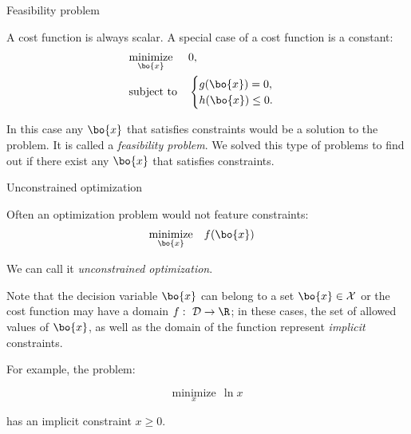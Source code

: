 \documentclass{beamer}
\begin{document}
\begin{frame}{Feasibility problem}
	\begin{flushleft}
		
		A cost function is always scalar. A special case of a cost function is a constant:
		\begin{equation}
			\begin{aligned}
				& \underset{\bo{x}}{\text{minimize}}
				& & 0, \\
				& \text{subject to}
				& & \begin{cases}
					g(\bo{x}) = 0, \\
					h(\bo{x}) \leq 0.
				\end{cases}
			\end{aligned}
		\end{equation}
	
		In this case any $\bo{x}$ that satisfies constraints would be a solution to the problem. It is called a \emph{feasibility problem}. We solved this type of problems to find out if there exist any $\bo{x}$ that satisfies constraints.
		
	\end{flushleft}
\end{frame}




\begin{frame}{Unconstrained optimization}
	\begin{flushleft}
		
		Often an optimization problem would not feature constraints:
		\begin{equation}
			\begin{aligned}
				& \underset{\bo{x}}{\text{minimize}}
				& & f(\bo{x})
			\end{aligned}
		\end{equation}
		
		We can call it \emph{unconstrained optimization}.
		
		\bigskip
		
		Note that the decision variable $\bo{x}$ can belong to a set $\bo{x} \in \mathcal{X}$ or the cost function may have a domain $f: \ \mathcal{D} \rightarrow \R$; in these cases, the set of allowed values of $\bo{x}$, as well as the domain of the function represent \emph{implicit} constraints. 
		
		\bigskip
		
		For example, the problem:
		
		$$\underset{x}{\text{minimize}} \ \ \ln x$$
		
		has an implicit constraint $x \geq 0$.
		
	\end{flushleft}
\end{frame}
\end{document}
